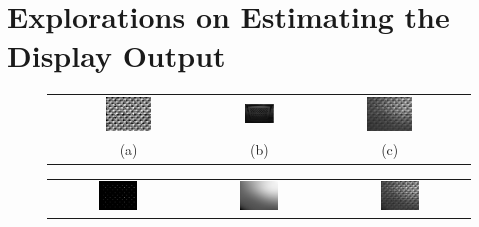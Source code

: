 \documentclass{report}
\begin{document}
\section{Explorations on Estimating the Display Output}

\begin{figure}
\centering
\begin{tabular}{ccc}
\includegraphics[width=0.3\textwidth]{images/display-pattern.png}&
\includegraphics[width=0.343\textwidth]{images/display-photo.png}&
\includegraphics[width=0.3\textwidth]{images/rendered.png}\\
(a) & (b) & (c)
\end{tabular}
\begin{tabular}{ccc}
\includegraphics[width=0.3\textwidth]{images/rendered-sample.png}&
\includegraphics[width=0.3\textwidth]{images/fitted-gray.png}&
\includegraphics[width=0.3\textwidth]{images/fitted-image.png}\\

\end{tabular}
\end{figure}
\end{document}
